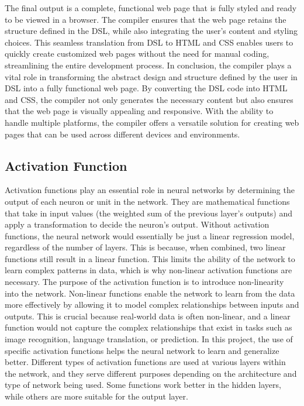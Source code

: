     The final output is a complete, functional web page that is fully styled and ready to be viewed in a browser. The compiler ensures that the web page retains the structure defined in the DSL, while also integrating the user’s content and styling choices. This seamless translation from DSL to HTML and CSS enables users to quickly create customized web pages without the need for manual coding, streamlining the entire development process.
    In conclusion, the compiler plays a vital role in transforming the abstract design and structure defined by the user in DSL into a fully functional web page. By converting the DSL code into HTML and CSS, the compiler not only generates the necessary content but also ensures that the web page is visually appealing and responsive. With the ability to handle multiple platforms, the compiler offers a versatile solution for creating web pages that can be used across different devices and environments.

\subsection{Activation Function}
Activation functions play an essential role in neural networks by determining the output of each neuron or unit in the network. They are mathematical functions that take in input values (the weighted sum of the previous layer’s outputs) and apply a transformation to decide the neuron’s output. Without activation functions, the neural network would essentially be just a linear regression model, regardless of the number of layers. This is because, when combined, two linear functions still result in a linear function. This limits the ability of the network to learn complex patterns in data, which is why non-linear activation functions are necessary.
The purpose of the activation function is to introduce non-linearity into the network. Non-linear functions enable the network to learn from the data more effectively by allowing it to model complex relationships between inputs and outputs. This is crucial because real-world data is often non-linear, and a linear function would not capture the complex relationships that exist in tasks such as image recognition, language translation, or prediction.
In this project, the use of specific activation functions helps the neural network to learn and generalize better. Different types of activation functions are used at various layers within the network, and they serve different purposes depending on the architecture and type of network being used. Some functions work better in the hidden layers, while others are more suitable for the output layer.
